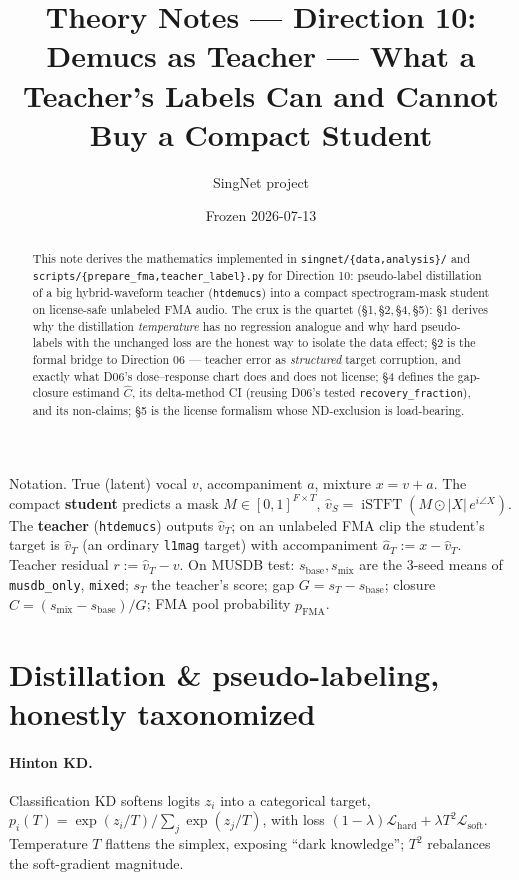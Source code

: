 \documentclass[11pt]{article}
\title{Theory Notes --- Direction 10:\\
Demucs as Teacher --- What a Teacher's Labels Can and Cannot Buy a Compact Student}
\author{SingNet project}
\date{Frozen 2026-07-13}
\newcommand{\code}[1]{\texttt{#1}}
\DeclareMathOperator{\iSTFT}{iSTFT}
\newcommand{\vhatT}{\hat v_T}
\newcommand{\ahatT}{\hat a_T}
\newcommand{\sbase}{s_{\text{base}}}
\newcommand{\smix}{s_{\text{mix}}}
\newcommand{\sT}{s_T}
\newcommand{\pfma}{p_{\text{FMA}}}
\newcommand{\Chat}{\hat C}
\begin{document}
\maketitle

\begin{abstract}
This note derives the mathematics implemented in \code{singnet/\{data,analysis\}/} and
\code{scripts/\{prepare\_fma,teacher\_label\}.py} for Direction 10: pseudo-label distillation
of a big hybrid-waveform teacher (\code{htdemucs}) into a compact spectrogram-mask student on
license-safe unlabeled FMA audio. The crux is the quartet (\S1,\,\S2,\,\S4,\,\S5): \S1 derives
why the distillation \emph{temperature} has no regression analogue and why hard pseudo-labels
with the unchanged loss are the honest way to isolate the data effect; \S2 is the formal bridge
to Direction 06 --- teacher error as \emph{structured} target corruption, and exactly what D06's
dose--response chart does and does not license; \S4 defines the gap-closure estimand $\Chat$, its
delta-method CI (reusing D06's tested \code{recovery\_fraction}), and its non-claims; \S5 is the
license formalism whose ND-exclusion is load-bearing.
\end{abstract}

Notation. True (latent) vocal $v$, accompaniment $a$, mixture $x=v+a$. The compact \textbf{student}
predicts a mask $M\in[0,1]^{F\times T}$, $\hat v_S=\iSTFT(M\odot|X|\,e^{i\angle X})$. The
\textbf{teacher} (\code{htdemucs}) outputs $\vhatT$; on an unlabeled FMA clip the student's target
is $\vhatT$ (an ordinary \code{l1mag} target) with accompaniment $\ahatT:=x-\vhatT$. Teacher
residual $r:=\vhatT-v$. On MUSDB test: $\sbase,\smix$ are the 3-seed means of \code{musdb\_only},
\code{mixed}; $\sT$ the teacher's score; gap $G=\sT-\sbase$; closure $\Chat=(\smix-\sbase)/G$; FMA
pool probability $\pfma$.

\section{Distillation \& pseudo-labeling, honestly taxonomized}

\paragraph{Hinton KD.} Classification KD softens logits $z_i$ into a categorical target,
$p_i(T)=\exp(z_i/T)/\sum_j\exp(z_j/T)$, with loss $(1-\lambda)\mathcal L_{\text{hard}}+\lambda
T^2\mathcal L_{\text{soft}}$. Temperature $T$ flattens the simplex, exposing ``dark knowledge'';
$T^2$ rebalances the soft-gradient magnitude.
\end{document}
